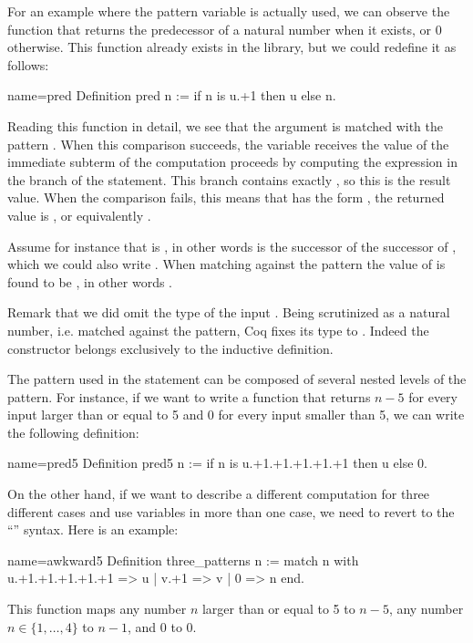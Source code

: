 For an example where the pattern variable is actually used, we can
observe the function that returns the predecessor of a natural number
when it exists, or 0 otherwise.  This function already exists in the library,
but we could redefine it as follows:

\begin{coq}{name=pred}{}
Definition pred n := if n is u.+1 then u else n.
\end{coq}
Reading this function in detail, we see that the argument  is
matched with the pattern .  When this comparison
succeeds, the variable  receives the value of the immediate
subterm of  the computation proceeds by computing the expression
in the  branch of the  statement.  This branch contains
exactly , so this is the result value.  When the comparison
fails, this means that  has the form , the returned value is
, or equivalently .

Assume for instance that  is , in other words  is the
successor of the successor of , which we could also write
.  When matching  against the pattern 
the value of  is found to be , in other words .

Remark that we did omit the type of the input .  Being  scrutinized
as a natural number, i.e. matched against the  pattern, Coq fixes its
type to .  Indeed the  constructor belongs exclusively to the
 inductive definition.

The pattern used in the  statement can be composed of
several nested levels of the  pattern.  For instance,
if we want to write a function
that returns \(n-5\) for every input larger than or equal to 5 and 0
for every input smaller than 5, we can write the following definition:

\begin{coq}{name=pred5}{}
Definition pred5 n :=
  if n is u.+1.+1.+1.+1.+1 then u else 0.
\end{coq}
On the other hand, if we want to describe a different computation for
three different cases and use variables in more than one case, we need
to revert to the ``'' syntax.  Here is an
example:

\begin{coq}{name=awkward5}{}
Definition three_patterns n :=
  match n with
    u.+1.+1.+1.+1.+1 => u
  | v.+1 => v
  | 0 => n
  end.
\end{coq}
This function maps any number \(n\) larger than or equal to 5 to \(n-5\),
any number \(n \in \{1, \ldots, 4\}\) to \(n-1\), and \(0\) to \(0\).

